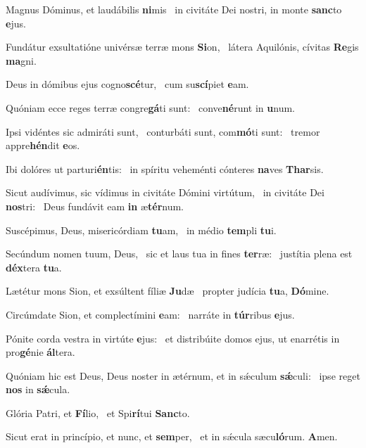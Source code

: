 \item Magnus Dóminus, et laudábilis \textbf{ni}mis~\psstar{} in civitáte Dei nostri, in monte \textbf{sanc}to \textbf{e}jus.
\item Fundátur exsultatióne univérsæ terræ mons \textbf{Si}on,~\psstar{} látera Aquilónis, cívitas \textbf{Re}gis \textbf{ma}gni.
\item Deus in dómibus ejus cogno\textbf{scé}tur,~\psstar{} cum su\textbf{scí}piet \textbf{e}am.
\item Quóniam ecce reges terræ congre\textbf{gá}ti sunt:~\psstar{} conve\textbf{né}runt in \textbf{u}num.
\item Ipsi vidéntes sic admiráti sunt,~\pscross{} conturbáti sunt, com\textbf{mó}ti sunt:~\psstar{} tremor appre\textbf{hén}dit \textbf{e}os.
\item Ibi dolóres ut parturi\textbf{én}tis:~\psstar{} in spíritu veheménti cónteres \textbf{na}ves \textbf{Thar}sis.
\item Sicut audívimus, sic vídimus in civitáte Dómini virtútum,~\pscross{} in civitáte Dei \textbf{nos}tri:~\psstar{} Deus fundávit eam \textbf{in} æ\textbf{tér}num.
\item Suscépimus, Deus, misericórdiam \textbf{tu}am,~\psstar{} in médio \textbf{tem}pli \textbf{tu}i.
\item Secúndum nomen tuum, Deus,~\pscross{} sic et laus tua in fines \textbf{ter}ræ:~\psstar{} justítia plena est \textbf{déx}tera \textbf{tu}a.
\item Lætétur mons Sion, et exsúltent fíliæ \textbf{Ju}dæ~\psstar{} propter judícia \textbf{tu}a, \textbf{Dó}mine.
\item Circúmdate Sion, et complectímini \textbf{e}am:~\psstar{} narráte in \textbf{túr}ribus \textbf{e}jus.
\item Pónite corda vestra in virtúte \textbf{e}jus:~\psstar{} et distribúite domos ejus, ut enarrétis in pro\textbf{gé}nie \textbf{ál}tera.
\item Quóniam hic est Deus, Deus noster in ætérnum, et in sǽculum \textbf{sǽ}culi:~\psstar{} ipse reget \textbf{nos} in \textbf{sǽ}cula.
\item Glória Patri, et \textbf{Fí}lio,~\psstar{} et Spi\textbf{rí}tui \textbf{Sanc}to.
\item Sicut erat in princípio, et nunc, et \textbf{sem}per,~\psstar{} et in sǽcula sæcu\textbf{ló}rum. \textbf{A}men.
